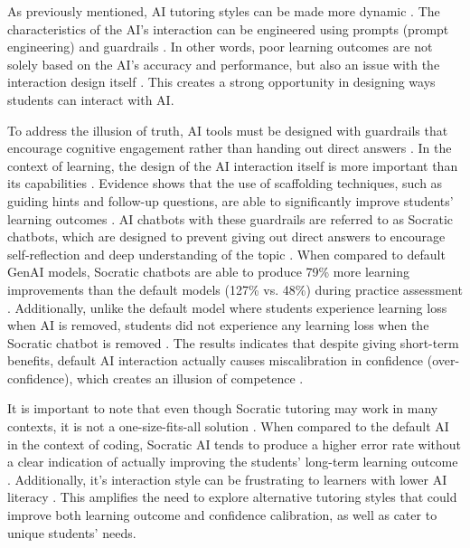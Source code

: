 \documentclass{article}
\begin{document}
As previously mentioned, AI tutoring styles can be made more dynamic \cite{wenjuan2024who}. 
The characteristics of the AI's interaction can be engineered 
using prompts (prompt engineering) and guardrails \cite{Yazici2024}. 
In other words, poor learning outcomes are not solely based on the AI's accuracy 
and performance, but also an issue with the interaction design itself \cite{Lyu2025,Bastani2025}. 
This creates a strong opportunity in designing ways students can interact with AI.

To address the illusion of truth, AI tools must be designed with guardrails that 
encourage cognitive engagement rather than handing out direct answers \cite{Wang2026SRL}.
In the context of learning, the design of the AI interaction itself is more important than its capabilities \cite{Bastani2025}.
Evidence shows that the use of scaffolding techniques, such as guiding hints and follow-up questions, 
are able to significantly improve students' learning outcomes \cite{Bastani2025}.
AI chatbots with these guardrails are referred to as Socratic chatbots, which are designed to prevent giving out 
direct answers to encourage self-reflection and deep understanding of the topic \cite{Jin2025, Hilliger2025, Jabbour2025}.
When compared to default GenAI models, Socratic chatbots are able to produce 79\% more learning 
improvements than the default models (127\% vs. 48\%) during practice assessment \cite{Bastani2025}. 
Additionally, unlike the default model where students experience 
learning loss when AI is removed, 
students did not experience any learning loss when the Socratic chatbot is removed \cite{Bastani2025}. 
The results indicates that despite giving short-term benefits, default AI 
interaction actually causes miscalibration in confidence (over-confidence), which
creates an illusion of competence \cite{Bastani2025}.

It is important to note that even though Socratic tutoring may work 
in many contexts, it is not a one-size-fits-all solution \cite{Liding2026}.
When compared to the default AI in the context of coding, Socratic 
AI tends to produce a higher error rate without a clear indication 
of actually improving the students' long-term learning outcome \cite{Liding2026}. 
Additionally, it's interaction style can be frustrating to 
learners with lower AI literacy \cite{Jin2025}. This amplifies the need 
to explore alternative tutoring styles that could improve both learning outcome  
and confidence calibration, as well as cater to unique students' needs.
\end{document}
